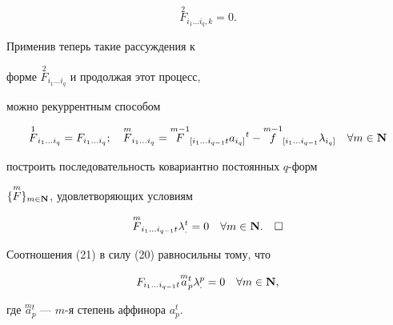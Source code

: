 $$


\overset{2}{F}{}_{i_1\dotsc i_q, k}=0.


$$


Применив теперь такие рассуждения к 


форме $\overset{2}{F}{}_{i_1\dotsc i_q}$ и продолжая этот процесс,


можно рекуррентным способом


\begin{equation}


\overset{1}{F}{}_{i_1\dotsc i_q}


=F_{i_1\dotsc i_q};\quad


\overset{m}{F}{}_{i_1\dotsc i_q}


=\overset{m-1}{F}{}_{[i_1\dotsc i_{q-1}t}a_{i_{q}]}{}^t-


\overset{m-1}{f}{}_{[i_1\dotsc i_{q-1}}\lambda_{{i_q}]}


\quad \forall m\in \bold N


\end{equation}


построить последовательность ковариантно постоянных $q$-форм


$\{\overset{m}{F}\}_{m \in \bold N}$, удовлетворяющих условиям


\begin{equation}


\overset{m}{F}{}_{i_1\dotsc i_{q-1}t }\lambda_.^t=0


\quad \forall m\in \bold N.\quad\square


\end{equation}





\begin{note}


Соотношения (21) в силу (20) равносильны тому, что 


\begin{equation}


F_{i_1\dotsc i_{q-1}t }\overset{m}{a}{}_p^t\lambda_.^p =0


\quad \forall m\in \bold N,


\end{equation}


где $\overset{m}{a}{}_p^t$ --- $m$-я степень аффинора $a_p^t$.


\end{note}





